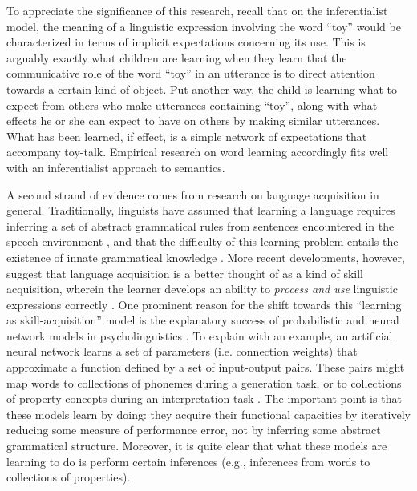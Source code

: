 To appreciate the significance of this research, recall that on the inferentialist model, the meaning of a linguistic expression involving the word ``toy'' would be characterized in terms of implicit expectations concerning its use. This is arguably exactly what children are learning when they learn that the communicative role of the word ``toy'' in an utterance is to direct attention towards a certain kind of object. Put another way, the child is learning what to expect from others who make utterances containing ``toy'', along with what effects he or she can expect to have on others by making similar utterances. What has been learned, if effect, is a simple network of expectations that accompany toy-talk. Empirical research on word learning accordingly fits well with an inferentialist approach to semantics. 

A second strand of evidence comes from research on language acquisition in general. Traditionally, linguists have assumed that learning a language requires inferring a set of abstract grammatical rules from sentences encountered in the speech environment \citep{Harley:2014,Pinker:1994,Seidenberg:1997}, and that the difficulty of this learning problem entails the existence of innate grammatical knowledge \citep{Harley:2014,Seidenberg:1997}. More recent developments, however, suggest that language acquisition is a better thought of as a kind of skill acquisition, wherein the learner develops an ability to \textit{process and use} linguistic expressions correctly \citep{Christiansen:2015,Seidenberg:1997}. One prominent reason for the shift towards this ``learning as skill-acquisition'' model is the explanatory success of probabilistic and neural network models in psycholinguistics \citep{Seidenberg:1997}. To explain with an example, an artificial neural network learns a set of parameters (i.e. connection weights) that approximate a function defined by a set of input-output pairs. These pairs might map words to collections of phonemes during a generation task, or to collections of property concepts during an interpretation task \citep[see, e.g.,][]{McClelland:2010}. The important point is that these models learn by doing: they acquire their functional capacities by iteratively reducing some measure of performance error, not by inferring some abstract grammatical structure. Moreover, it is quite clear that what these models are learning to do is perform certain inferences (e.g., inferences from words to collections of properties). 

